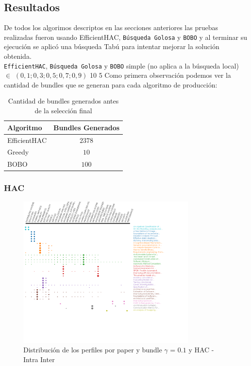 \subsection{Resultados}
De todos los algorimos descriptos en las secciones anteriores las pruebas realizadas fueron usando {EfficientHAC}, \texttt{Búsqueda Golosa} y \texttt{BOBO} y al terminar su ejecución se aplicó una búsqueda Tabú para intentar mejorar la solución obtenida.\\
\Solucion
{}
{\texttt{EfficientHAC}, \texttt{Búsqueda Golosa} y \texttt{BOBO}}
{simple (no aplica a la búsqueda local)}
{$\in$ $(0,1; 0,3; 0,5; 0,7; 0,9)$}
{10}
{5}
Como primera observación podemos ver la cantidad de bundles que se generan para cada algoritmo de 
producción:\\
\begin{table}[h]
  \centering
  \resizebox{0.5\textwidth}{!} {
    \begin{tabular}{|lc|}
    \hline
    Algoritmo & Bundles Generados \\
    \hline
    EfficientHAC & $2378$ \\
    Greedy & $10$ \\
    BOBO & $100$ \\
    \hline
    \end{tabular}
  }
    \caption {Cantidad de bundles generados antes de la selección final}
\end{table}

\subsubsection{HAC}
\begin{figure}[H]
  \centering
    \includegraphics[width=0.8\textwidth]{resultados/papers/HAC/INTRA_INTER/gamma-01.png}
  \caption{Distribución de los perfiles por paper y bundle $\gamma$ = $0.1$ y HAC - Intra Inter}
  \label{res:img-papers-gamma01-hac-intra-inter}
\end{figure}

